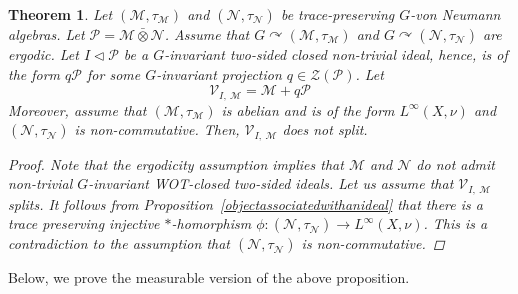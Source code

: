 \documentclass[12pt]{amsart}
\newtheorem{thm}{Theorem}[section]
\theoremstyle{definition}
\begin{document}
\begin{thm}
\label{thm:gensplitidealvna}
Let $(\mathcal{M},\tau_{\mathcal{M}})$ and $(\mathcal{N},\tau_{\mathcal{N}})$ be trace-preserving $G$-von Neumann algebras. Let $\mathcal{P}=\mathcal{M}\bar{\otimes}\mathcal{N}$. Assume that $G\curvearrowright(\mathcal{M},\tau_{\mathcal{M}})$ and $G\curvearrowright(\mathcal{N},\tau_{\mathcal{N}})$ are ergodic. Let $I\triangleleft \mathcal{P}$ be a $G$-invariant two-sided closed non-trivial ideal, hence, is of the form $q\mathcal{P}$ for some $G$-invariant projection $q\in\mathcal{Z}(\mathcal{P})$. Let\[\mathcal{V}_{I,~\mathcal{M}}=\mathcal{M}+q\mathcal{P}\]    
Moreover, assume that $\left(\mathcal{M},\tau_{\mathcal{M}}\right)$ is abelian and is of the form $L^{\infty}(X,\nu)$ and $(\mathcal{N},\tau_{\mathcal{N}})$ is non-commutative. Then, $\mathcal{V}_{I,~\mathcal{M}}$ does not split. 
\begin{proof}
Note that the ergodicity assumption implies that  $\mathcal{M}$ and $\mathcal{N}$ do not admit non-trivial $G$-invariant WOT-closed two-sided ideals. 
Let us assume that $\mathcal{V}_{I,~\mathcal{M}}$ splits. 
It follows from Proposition~\ref{objectassociatedwithanideal} that there is a trace preserving injective $*$-homorphism $\phi:(\mathcal{N},\tau_{\mathcal{N}})\to  L^{\infty}(X,\nu) $. This is a contradiction to the assumption that $(\mathcal{N},\tau_{\mathcal{N}})$ is non-commutative. 
\end{proof}
\end{thm}
Below, we prove the measurable version of the above proposition.
\end{document}
